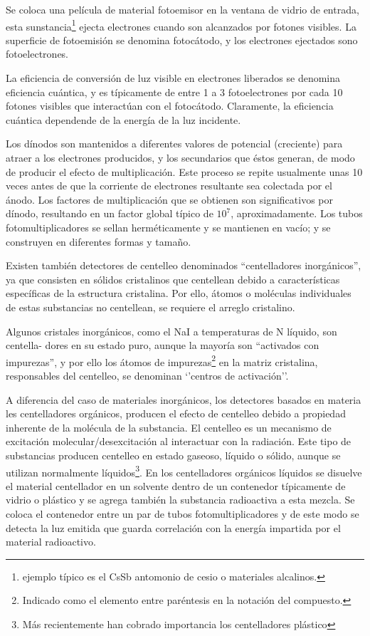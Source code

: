 %
Se coloca una pel\'icula de material fotoemisor en la ventana de vidrio de entrada, esta sunstancia\footnote{ejemplo t\'ipico es el CsSb 
antomonio de cesio o 
materiales alcalinos.} ejecta electrones cuando son alcanzados por fotones visibles. La superficie de fotoemisi\'on se denomina 
fotoc\'atodo, y los electrones 
ejectados sono fotoelectrones. 
%

%
La eficiencia de conversi\'on de luz visible en electrones liberados se denomina eficiencia cu\'antica, y es t\'ipicamente de entre 1 a 3 
fotoelectrones por 
cada 10 fotones visibles que interact\'uan con el fotoc\'atodo. Claramente, la eficiencia cu\'antica dependende de la energ\'ia de la luz 
incidente.
%

%
Los d\'inodos son mantenidos a diferentes valores de potencial (creciente) para atraer a los electrones producidos, y los secundarios que 
\'estos generan, de modo 
de producir el efecto de multiplicaci\'on. Este proceso se repite usualmente unas 10 veces antes de que la corriente de electrones 
resultante sea colectada por 
el \'anodo. Los factores de multiplicaci\'on que se obtienen son significativos por d\'inodo, resultando en un factor global t\'ipico de 
$10^{7}$, 
aproximadamente. Los tubos fotomultiplicadores se sellan herm\'eticamente y se mantienen en vac\'io; y se construyen en diferentes formas y 
tama\~no.
%

%
Existen tambi\'en detectores de centelleo denominados ``centelladores inorg\'anicos'', ya que consisten en s\'olidos cristalinos que 
centellean debido a 
caracter\'isticas espec\'ificas de la estructura cristalina. Por ello, \'atomos o mol\'eculas individuales de estas substancias no 
centellean, 
se requiere el arreglo cristalino.
%

%
Algunos cristales inorg\'anicos, como el NaI a temperaturas de N l\'iquido, son centella-\-
dores en su estado puro, aunque la mayor\'ia son ``activados con 
impurezas'', y por ello los \'atomos de impurezas\footnote{Indicado como el elemento entre par\'entesis en la notaci\'on del compuesto.} en 
la matriz 
cristalina, responsables del centelleo, se denominan `'centros de activaci\'on''. 

A diferencia del caso de materiales inorg\'anicos, los detectores basados en materia\-
les centelladores org\'anicos, producen el efecto de centelleo debido a 
propiedad inherente de la mol\'ecula de la substancia. El centelleo 
es un mecanismo de excitaci\'on molecular/desexcitaci\'on al interactuar con la radiaci\'on. Este tipo de substancias producen centelleo 
en estado gaseoso, 
l\'iquido o s\'olido, aunque se utilizan normalmente l\'iquidos\footnote{M\'as recientemente han cobrado importancia los centelladores 
pl\'astico}.
En los centelladores org\'anicos l\'iquidos se disuelve el material centellador en un solvente dentro de un contenedor t\'ipicamente de 
vidrio 
o pl\'astico y se agrega tambi\'en la substancia radioactiva a esta mezcla. Se coloca el contenedor entre un par de tubos 
fotomultiplicadores y de este 
modo se detecta la luz emitida que guarda correlaci\'on con la energ\'ia impartida por el material radioactivo.
%

